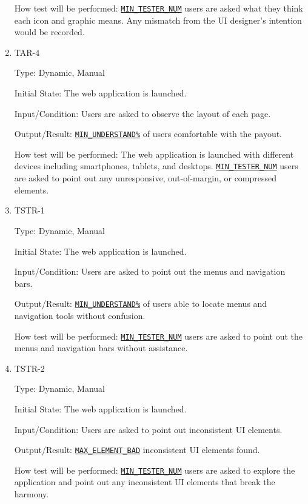 \documentclass[12pt, titlepage]{article}
\begin{document}
\begin{enumerate}
How test will be performed: \hyperref[MIN_TESTER_NUM]{\texttt{MIN\_TESTER\_NUM}} users are asked what they think each icon and graphic means. Any mismatch from the UI designer's intention would be recorded.

\item{TAR-4\\}\label{TAR-4}

Type: Dynamic, Manual
					
Initial State: The web application is launched.
					
Input/Condition: Users are asked to observe the layout of each page.
					
Output/Result: \hyperref[MIN_UNDERSTAND]{\texttt{MIN\_UNDERSTAND\%}} of users comfortable with the payout.
					
How test will be performed: The web application is launched with different devices including smartphones, tablets, and desktops.  \hyperref[MIN_TESTER_NUM]{\texttt{MIN\_TESTER\_NUM}} users are asked to point out any unresponsive, out-of-margin, or compressed elements.

\item{TSTR-1\\}\label{TSTR-1}

Type: Dynamic, Manual
					
Initial State: The web application is launched.
					
Input/Condition: Users are asked to point out the menus and navigation bars.
					
Output/Result: \hyperref[MIN_UNDERSTAND]{\texttt{MIN\_UNDERSTAND\%}} of users able to locate menus and navigation tools without confusion.
					
How test will be performed: \hyperref[MIN_TESTER_NUM]{\texttt{MIN\_TESTER\_NUM}} users are asked to point out the menus and navigation bars without assistance.

\item{TSTR-2\\}\label{TSTR-2}

Type: Dynamic, Manual
					
Initial State: The web application is launched.
					
Input/Condition: Users are asked to point out inconsistent UI elements.
					
Output/Result: \hyperref[MAX_ELEMENT_BAD]{\texttt{MAX\_ELEMENT\_BAD}} inconsistent UI elements found.
					
How test will be performed: \hyperref[MIN_TESTER_NUM]{\texttt{MIN\_TESTER\_NUM}} users are asked to explore the application and point out any inconsistent UI elements that break the harmony.


\end{enumerate}
\end{document}
